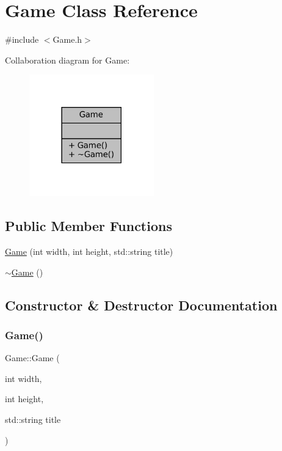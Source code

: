 \hypertarget{classGame}{}\section{Game Class Reference}
\label{classGame}


{\ttfamily \#include $<$Game.\+h$>$}



Collaboration diagram for Game\+:\nopagebreak
\begin{figure}[H]
\begin{center}
\leavevmode
\includegraphics[width=153pt]{classGame__coll__graph}
\end{center}
\end{figure}
\subsection*{Public Member Functions}
\begin{DoxyCompactItemize}
\item 
\mbox{\hyperlink{classGame_a0688bdc6486839d4436175d1d05773e0}{Game}} (int width, int height, std\+::string title)
\item 
\mbox{\hyperlink{classGame_ae3d112ca6e0e55150d2fdbc704474530}{$\sim$\+Game}} ()
\end{DoxyCompactItemize}


\subsection{Constructor \& Destructor Documentation}
\mbox{\label{classGame_a0688bdc6486839d4436175d1d05773e0}} 
\subsubsection{\texorpdfstring{Game()}{Game()}}
{\footnotesize\ttfamily Game\+::\+Game (\begin{DoxyParamCaption}\item[{int}]{width,  }\item[{int}]{height,  }\item[{std\+::string}]{title }\end{DoxyParamCaption})}

